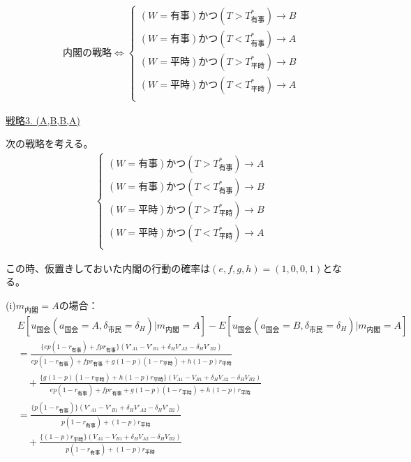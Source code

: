 \documentclass[main.tex]{subfiles}
\begin{document}
\begin{align*}
    \text{内閣の戦略} \Leftrightarrow 
    \begin{cases}
        (W=有事) かつ (T>T^*_{有事})  \rightarrow B\\
        (W=有事) かつ (T<T^*_{有事})  \rightarrow A\\
        (W=平時) かつ (T>T^*_{平時})  \rightarrow B\\
        (W=平時) かつ (T<T^*_{平時})   \rightarrow A\\[1em]
    \end{cases}
\end{align*}






















\bigskip
\noindent
\underline{戦略3. (A,B,B,A)}

次の戦略を考える。
\begin{align*}
    \begin{cases}
        (W=有事) かつ (T>T^*_{有事})  \rightarrow A\\
        (W=有事) かつ (T<T^*_{有事})  \rightarrow B\\
        (W=平時) かつ (T>T^*_{平時})  \rightarrow B\\
        (W=平時) かつ (T<T^*_{平時})   \rightarrow A\\
    \end{cases}
\end{align*}

この時、仮置きしておいた内閣の行動の確率は$(e,f,g,h) = (1,0,0,1)$となる。



(i)$m_{内閣}=A$の場合：
\begin{align*}
    & E[u_{国会}(a_{国会}=A, \delta_{市民}=\delta_H) | m_{内閣} = A  ] - E[u_{国会}(a_{国会}=B, \delta_{市民}=\delta_H) | m_{内閣} = A  ]\\[1em]
    &= \frac{ \{ep(1-r_{有事}) +  fpr_{有事}\}(V'_{A1} -V'_{B1} + \delta_H V'_{A2} - \delta_H V'_{B2})  }{ ep(1-r_{有事}) + fpr_{有事} + g(1-p)(1-r_{平時}) + h(1-p)r_{平時} }\\[1em]
    &\quad + \frac{ \{g(1-p)(1-r_{平時}) + h(1-p)r_{平時}\}(V_{A1} - V_{B1} + \delta_H V_{A2} - \delta_H V_{B2} ) }{ ep(1-r_{有事}) + fpr_{有事} + g(1-p)(1-r_{平時}) + h(1-p)r_{平時} }\\[1em]
    &= \frac{ \{p(1-r_{有事})\}(V'_{A1} -V'_{B1} + \delta_H V'_{A2} - \delta_H V'_{B2})  }{ p(1-r_{有事}) + (1-p)r_{平時} }\\[1em]
    &\quad + \frac{ \{ (1-p)r_{平時}\}(V_{A1} - V_{B1} + \delta_H V_{A2} - \delta_H V_{B2} ) }{ p(1-r_{有事}) + (1-p)r_{平時} }\\
\end{align*}
\end{document}
